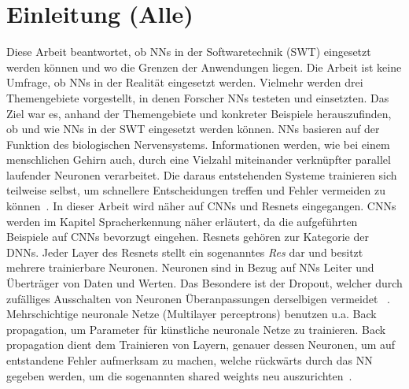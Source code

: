 \section{Einleitung (Alle)}
Diese Arbeit beantwortet, ob NNs in der Softwaretechnik (SWT) eingesetzt werden können und wo die Grenzen der Anwendungen liegen. Die Arbeit ist keine Umfrage, ob NNs in der Realität eingesetzt werden. Vielmehr werden drei Themengebiete vorgestellt, in denen Forscher NNs testeten und einsetz\-ten. Das Ziel war es, anhand der Themengebiete und konkreter Beispiele herauszufinden, ob und wie NNs in der SWT eingesetzt werden können.
NNs basieren auf der Funktion des biologischen Nervensystems. Informationen werden, wie bei einem menschlichen Gehirn auch, durch eine Vielzahl miteinander verknüpfter parallel laufender Neuronen  verarbeitet. Die daraus entstehenden Systeme trainieren sich teilweise selbst, um schnellere Entscheidungen treffen und Fehler vermeiden zu können~\cite{technology}. 
In dieser Arbeit wird näher auf CNNs und Resnets eingegangen. CNNs werden im Kapitel Spracherkennung näher erläutert, da die aufgeführten Beispiele auf CNNs bevorzugt eingehen. Resnets gehören zur Kategorie der DNNs. Jeder Layer des Resnets stellt ein sogenanntes \textit{Res} dar und besitzt mehrere trainierbare Neuronen. Neuronen sind in Bezug auf NNs Leiter und Überträger von Daten und Werten. Das Besondere ist der Dropout, welcher durch zufälliges Ausschalten von Neuronen Überanpassungen derselbigen vermeidet ~\cite{residualnn}. Mehrschichtige neuronale Netze (Multilayer perceptrons) benutzen u.a. Back propagation, um Parameter für künstliche neuronale Netze zu trainieren. Back propagation dient dem Trainieren von Layern, genauer dessen Neuronen, um auf entstandene Fehler aufmerksam zu machen, welche rückwärts durch das NN gegeben werden, um die sogenannten shared weights neu auszurichten~\cite{usingcnn}.\\
\vspace{6.0cm}

